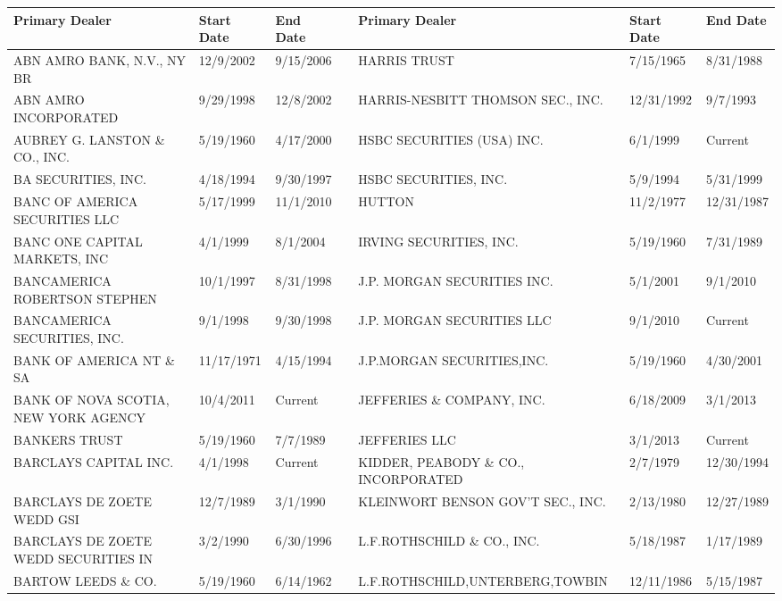 \documentclass{article}
\begin{document}
\begin{tabular}{lllllll}
\toprule
Primary Dealer & Start Date & End Date &  & Primary Dealer & Start Date & End Date \\
\midrule
ABN AMRO BANK, N.V., NY BR           & 12/9/2002 & 9/15/2006 &  & HARRIS TRUST                        & 7/15/1965 & 8/31/1988 \\
ABN AMRO INCORPORATED                & 9/29/1998 & 12/8/2002 &  & HARRIS-NESBITT THOMSON SEC., INC.   & 12/31/1992 & 9/7/1993 \\
AUBREY G. LANSTON \& CO., INC.       & 5/19/1960 & 4/17/2000 &  & HSBC SECURITIES (USA) INC.           & 6/1/1999 & Current \\
BA SECURITIES, INC.                 & 4/18/1994 & 9/30/1997 &  & HSBC SECURITIES, INC.                & 5/9/1994 & 5/31/1999 \\
BANC OF AMERICA SECURITIES LLC            & 5/17/1999 & 11/1/2010 &  & HUTTON                               & 11/2/1977 & 12/31/1987 \\
BANC ONE CAPITAL MARKETS, INC       & 4/1/1999 & 8/1/2004 &  & IRVING SECURITIES, INC.              & 5/19/1960 & 7/31/1989 \\
BANCAMERICA ROBERTSON STEPHEN       & 10/1/1997 & 8/31/1998 &  & J.P. MORGAN SECURITIES INC.         & 5/1/2001 & 9/1/2010 \\
BANCAMERICA SECURITIES, INC.        & 9/1/1998 & 9/30/1998 &  & J.P. MORGAN SECURITIES LLC & 9/1/2010 & Current \\
BANK OF AMERICA NT \& SA             & 11/17/1971 & 4/15/1994 &  & J.P.MORGAN SECURITIES,INC.           & 5/19/1960 & 4/30/2001 \\
BANK OF NOVA SCOTIA, NEW YORK AGENCY & 10/4/2011 & Current &  & JEFFERIES \& COMPANY, INC. & 6/18/2009 & 3/1/2013 \\
BANKERS TRUST                        & 5/19/1960 & 7/7/1989 &  & JEFFERIES LLC & 3/1/2013 & Current \\
BARCLAYS CAPITAL INC.                & 4/1/1998 & Current &  & KIDDER, PEABODY \& CO., INCORPORATED & 2/7/1979 & 12/30/1994 \\
BARCLAYS DE ZOETE WEDD GSI           & 12/7/1989 & 3/1/1990 &  & KLEINWORT BENSON  GOV'T SEC., INC.   & 2/13/1980 & 12/27/1989 \\
BARCLAYS DE ZOETE WEDD SECURITIES IN & 3/2/1990 & 6/30/1996 &  & L.F.ROTHSCHILD \& CO., INC.      & 5/18/1987 & 1/17/1989 \\
BARTOW LEEDS \& CO.                   & 5/19/1960 & 6/14/1962 &  & L.F.ROTHSCHILD,UNTERBERG,TOWBIN & 12/11/1986 & 5/15/1987 \\

\end{tabular}
\end{document}
